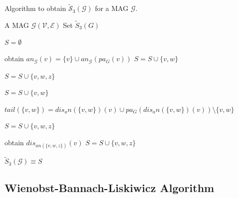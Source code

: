 \documentclass[a4paper]{article}
\begin{document}
\begin{algorithm}
	\caption{Algorithm to obtain $\mathcal{\tilde{S}}_3(\mathcal{G})$ for a MAG $\mathcal{G}$.}
	\label{alg:hu}
	\begin{algorithmic}[1]
		\renewcommand{\algorithmicrequire}{\textbf{Input:}}
		\renewcommand{\algorithmicensure}{\textbf{Output:}}
		\Require A MAG $\mathcal{G}(\mathcal{V}, \mathcal{E})$
		\Ensure Set $\tilde{S}_3(G)$
		
		\State $S = \emptyset$
		
		\State obtain $an_\mathcal{G}(v) = \{v\} \cup an_\mathcal{G}(pa_G(v))$
		\State $S = S \cup \{v, w\}$
		\EndFor
		
		\State $S = S \cup \{v, w, z\}$
		\EndFor
		\EndFor
		
		\State $S = S \cup \{v, w\}$
		
		\State $tail(\{v, w\}) = dis_an(\{v,w\})(v) \cup pa_G(dis_an{(\{v,w\})}(v)) \setminus \{v, w\}$
		
		\State $S = S \cup \{v, w, z\}$
		\EndFor
		
		\State obtain $dis_{an(\{v,w,z\})}(v)$
		\State $S = S \cup \{v, w, z\}$
		\EndIf
		\EndIf
		\EndFor
		\EndFor 
		
		\Return $\tilde{S}_3(\mathcal{G}) \equiv S$
	\end{algorithmic}
\end{algorithm}

\newpage

\subsection{Wienobst-Bannach-Liskiwicz Algorithm}
\end{document}
